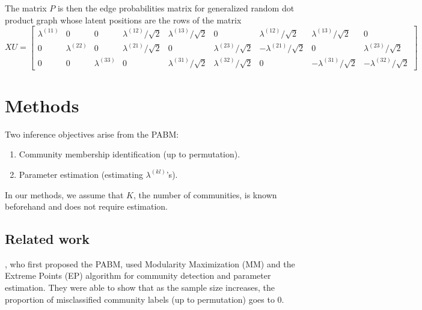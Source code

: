 \documentclass[12pt]{article}
\providecommand{\tightlist}{%
  \setlength{\itemsep}{0pt}\setlength{\parskip}{0pt}}
\begin{document}
\begin{example}
The matrix $P$ is then the edge probabilities matrix for generalized random dot product
graph whose latent positions are the rows of the matrix
$$XU = \begin{bmatrix}
  \lambda^{(11)} & 0 & 0 &
  \lambda^{(12)} / \sqrt{2} & \lambda^{(13)} / \sqrt{2} & 0 &
  \lambda^{(12)} / \sqrt{2} & \lambda^{(13)} / \sqrt{2} & 0 \\
  0 & \lambda^{(22)} & 0 &
  \lambda^{(21)} / \sqrt{2} & 0 & \lambda^{(23)} / \sqrt{2} &
  -\lambda^{(21)} / \sqrt{2} & 0 & \lambda^{(23)} / \sqrt{2} \\
  0 & 0 & \lambda^{(33)} &
  0 & \lambda^{(31)} / \sqrt{2} & \lambda^{(32)} / \sqrt{2} &
  0 & -\lambda^{(31)} / \sqrt{2} & -\lambda^{(32)} / \sqrt{2}
\end{bmatrix}$$
\end{example}

\hypertarget{methods}{%
\section{Methods}\label{methods}}

Two inference objectives arise from the PABM:

\begin{enumerate}
\def\labelenumi{\arabic{enumi}.}
\tightlist
\item
  Community membership identification (up to permutation).
\item
  Parameter estimation (estimating \(\lambda^{(kl)}\)'s).
\end{enumerate}

In our methods, we assume that \(K\), the number of communities, is
known beforehand and does not require estimation.

\hypertarget{related-work}{%
\subsection{Related work}\label{related-work}}

\citet{307cbeb9b1be48299388437423d94bf1}, who first proposed the
PABM, used Modularity Maximization (MM) and the Extreme Points (EP)
algorithm \cite{le2016} for community detection and parameter
estimation. They were able to show that as the sample size increases,
the proportion of misclassified community labels (up to permutation)
goes to 0.
\end{document}
